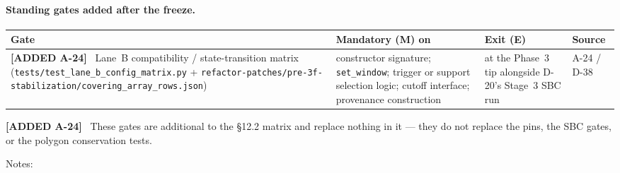 \documentclass[
  10pt,
]{article}
\newcommand{\amdnew}[1]{{\color{amdcolor}\footnotesize\textbf{[ADDED #1]}}\ }
\begin{document}
\paragraph{Standing gates added after the freeze.}
\begin{longtable}[]{@{}
  >{\raggedright\arraybackslash}p{}
  >{\raggedright\arraybackslash}p{}
  >{\raggedright\arraybackslash}p{}
  >{\raggedright\arraybackslash}p{}@{}}
\toprule\noalign{}
Gate & Mandatory (\textbf{M}) on & Exit (\textbf{E}) & Source \\
\midrule\noalign{}
\endhead
\bottomrule\noalign{}
\endlastfoot
\amdnew{A-24} Lane~B compatibility / state-transition matrix (\texttt{tests/test\_lane\_b\_config\_matrix.py} + \texttt{refactor-patches/pre-3f-stabilization/covering\_array\_rows.json}) & constructor signature; \texttt{set\_window}; trigger or support selection logic; cutoff interface; provenance construction & at the Phase~3 tip alongside D-20's Stage~3 SBC run & A-24 / D-38 \\
\end{longtable}

\amdnew{A-24} These gates are additional to the §12.2 matrix and replace nothing in it --- they do not replace the pins, the SBC gates, or the polygon conservation tests.

Notes:
\end{document}
